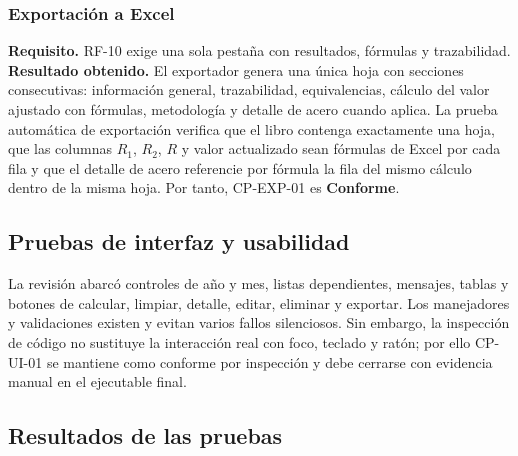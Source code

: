\documentclass[12pt,letterpaper]{article}
\begin{document}
\subsubsection{Exportación a Excel}

\textbf{Requisito.} RF-10 exige una sola pestaña con resultados, fórmulas y trazabilidad. \textbf{Resultado obtenido.} El exportador genera una única hoja con secciones consecutivas: información general, trazabilidad, equivalencias, cálculo del valor ajustado con fórmulas, metodología y detalle de acero cuando aplica. La prueba automática de exportación verifica que el libro contenga exactamente una hoja, que las columnas \(R_1\), \(R_2\), \(R\) y valor actualizado sean fórmulas de Excel por cada fila y que el detalle de acero referencie por fórmula la fila del mismo cálculo dentro de la misma hoja. Por tanto, CP-EXP-01 es \textbf{Conforme}.

\subsection{Pruebas de interfaz y usabilidad}

La revisión abarcó controles de año y mes, listas dependientes, mensajes, tablas y botones de calcular, limpiar, detalle, editar, eliminar y exportar. Los manejadores y validaciones existen y evitan varios fallos silenciosos. Sin embargo, la inspección de código no sustituye la interacción real con foco, teclado y ratón; por ello CP-UI-01 se mantiene como conforme por inspección y debe cerrarse con evidencia manual en el ejecutable final.

\subsection{Resultados de las pruebas}
\end{document}
